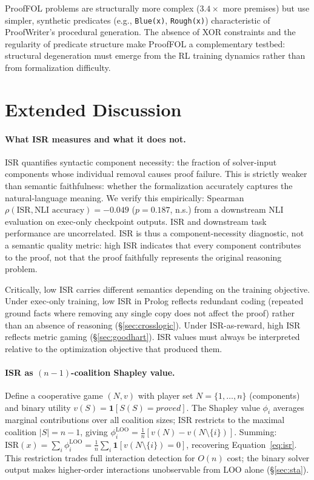 ProofFOL problems are structurally more complex ($3.4{\times}$ more premises) but use simpler, synthetic predicates (e.g., \texttt{Blue(x)}, \texttt{Rough(x)}) characteristic of ProofWriter's procedural generation.
The absence of XOR constraints and the regularity of predicate structure make ProofFOL a complementary testbed: structural degeneration must emerge from the RL training dynamics rather than from formalization difficulty.

\section{Extended Discussion}
\label{app:extended-discussion}

\paragraph{What ISR measures and what it does not.}
ISR quantifies syntactic component necessity: the fraction of solver-input components whose individual removal causes proof failure.
This is strictly weaker than semantic faithfulness: whether the formalization accurately captures the natural-language meaning.
We verify this empirically: Spearman $\rho(\text{ISR}, \text{NLI accuracy}) = -0.049$ ($p = 0.187$, n.s.) from a downstream NLI evaluation on exec-only checkpoint outputs.
ISR and downstream task performance are uncorrelated.
ISR is thus a component-necessity diagnostic, not a semantic quality metric: high ISR indicates that every component contributes to the proof, not that the proof faithfully represents the original reasoning problem.

Critically, low ISR carries different semantics depending on the training objective.
Under exec-only training, low ISR in Prolog reflects redundant coding (repeated ground facts where removing any single copy does not affect the proof) rather than an absence of reasoning (\S\ref{sec:crosslogic}).
Under ISR-as-reward, high ISR reflects metric gaming (\S\ref{sec:goodhart}).
ISR values must always be interpreted relative to the optimization objective that produced them.

\paragraph{ISR as $(n{-}1)$-coalition Shapley value.}
\label{app:shapley}
Define a cooperative game $(N, v)$ with player set $N = \{1,\ldots,n\}$ (components) and binary utility $v(S) = \mathbf{1}[S(S){=}\textit{proved}]$.
The Shapley value $\phi_i$ averages marginal contributions over all coalition sizes; ISR restricts to the maximal coalition $|S|{=}n{-}1$, giving $\phi_i^{\text{LOO}} = \frac{1}{n}[v(N) - v(N \setminus \{i\})]$.
Summing: $\text{ISR}(x) = \sum_i \phi_i^{\text{LOO}} = \frac{1}{n}\sum_i \mathbf{1}[v(N \setminus \{i\}){=}0]$, recovering Equation~\ref{eq:isr}.
This restriction trades full interaction detection for $O(n)$ cost; the binary solver output makes higher-order interactions unobservable from LOO alone (\S\ref{sec:sta}).

